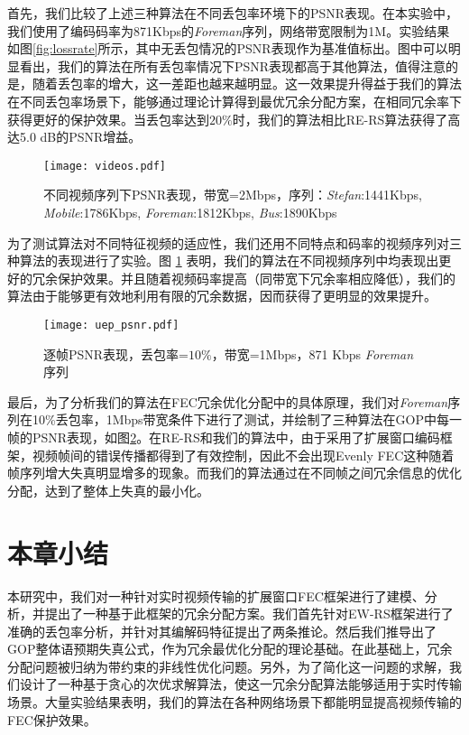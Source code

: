 首先，我们比较了上述三种算法在不同丢包率环境下的PSNR表现。在本实验中，我们使用了编码码率为871Kbps的\emph{Foreman}序列，网络带宽限制为1M。实验结果如图\ref{fig:lossrate}所示，其中无丢包情况的PSNR表现作为基准值标出。图中可以明显看出，我们的算法在所有丢包率情况下PSNR表现都高于其他算法，值得注意的是，随着丢包率的增大，这一差距也越来越明显。这一效果提升得益于我们的算法在不同丢包率场景下，能够通过理论计算得到最优冗余分配方案，在相同冗余率下获得更好的保护效果。当丢包率达到$20\%$时，我们的算法相比RE-RS算法获得了高达5.0 dB的PSNR增益。

\begin{figure}[htbp]
  \centering
  \texttt{[image: videos.pdf]}\\
  \caption{不同视频序列下PSNR表现，带宽=2Mbps，序列：\emph{Stefan}:1441Kbps, \emph{Mobile}:1786Kbps, \emph{Foreman}:1812Kbps, \emph{Bus}:1890Kbps}\label{fig:videos}
\end{figure}

为了测试算法对不同特征视频的适应性，我们还用不同特点和码率的视频序列对三种算法的表现进行了实验。图 \ref{fig:videos} 表明，我们的算法在不同视频序列中均表现出更好的冗余保护效果。并且随着视频码率提高（同带宽下冗余率相应降低），我们的算法由于能够更有效地利用有限的冗余数据，因而获得了更明显的效果提升。

\begin{figure}[htbp]
  \centering
  \texttt{[image: uep\_psnr.pdf]}
  \caption{逐帧PSNR表现，丢包率=$10\%$，带宽=1Mbps，871 Kbps \emph{Foreman}序列}\label{fig:psnr}
\end{figure}

最后，为了分析我们的算法在FEC冗余优化分配中的具体原理，我们对\emph{Foreman}序列在10\%丢包率，1Mbps带宽条件下进行了测试，并绘制了三种算法在GOP中每一帧的PSNR表现，如图\ref{fig:psnr}。在RE-RS和我们的算法中，由于采用了扩展窗口编码框架，视频帧间的错误传播都得到了有效控制，因此不会出现Evenly FEC这种随着帧序列增大失真明显增多的现象。而我们的算法通过在不同帧之间冗余信息的优化分配，达到了整体上失真的最小化。


\section{本章小结}
本研究中，我们对一种针对实时视频传输的扩展窗口FEC框架进行了建模、分析，并提出了一种基于此框架的冗余分配方案。我们首先针对EW-RS框架进行了准确的丢包率分析，并针对其编解码特征提出了两条推论。然后我们推导出了GOP整体语预期失真公式，作为冗余最优化分配的理论基础。在此基础上，冗余分配问题被归纳为带约束的非线性优化问题。另外，为了简化这一问题的求解，我们设计了一种基于贪心的次优求解算法，使这一冗余分配算法能够适用于实时传输场景。大量实验结果表明，我们的算法在各种网络场景下都能明显提高视频传输的FEC保护效果。
